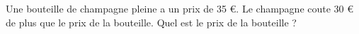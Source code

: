 
Une bouteille de champagne pleine a un prix de 35 €. Le champagne coute 30 € de plus que le prix de la bouteille. Quel est le prix de la bouteille ?